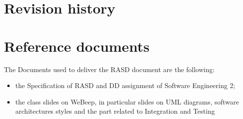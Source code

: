 	\section{Revision history}
		\begin{center}
		\end{center}
	\section{Reference documents}
		The Documents used to deliver the RASD document are the following:
		\begin{itemize}
			\item the Specification of RASD and DD assignment of Software Engineering 2;
			\item the class slides on WeBeep, in particular slides on UML diagrams, software architectures styles and the part related to Integration and Testing
		\end{itemize}
